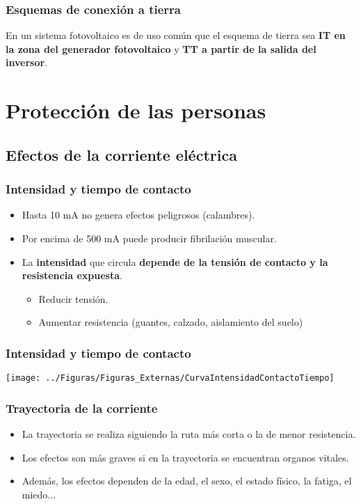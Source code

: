 \documentclass[serif, xcolor=dvipsnames]{beamer}
\begin{document}
\begin{frame}
\frametitle{Esquemas de conexión a tierra}
\begin{block}
{}

En un sistema fotovoltaico es de uso común que el esquema de tierra
sea \textbf{IT en la zona del generador fotovoltaico} y \textbf{TT
a partir de la salida del inversor}. 

\end{block}

\end{frame}

\section{Protección de las personas}


\subsection{Efectos de la corriente eléctrica}


\begin{frame}
\frametitle{Intensidad y tiempo de contacto}
\begin{itemize}
\item Hasta 10 mA no genera efectos peligrosos (calambres).
\item Por encima de 500 mA puede producir fibrilación muscular.
\item La \textbf{intensidad} que circula \textbf{depende de la tensión de
contacto y la resistencia expuesta}.

\begin{itemize}
\item Reducir tensión.
\item Aumentar resistencia (guantes, calzado, aislamiento del suelo)
\end{itemize}
\end{itemize}

\end{frame}

\begin{frame}[plain]
\frametitle{Intensidad y tiempo de contacto}

\texttt{[image: ../Figuras/Figuras\_Externas/CurvaIntensidadContactoTiempo]}


\end{frame}

\begin{frame}
\frametitle{Trayectoria de la corriente}
\begin{itemize}
\item La trayectoria se realiza siguiendo la ruta más corta o la de menor
resistencia.
\item Los efectos son más graves si en la trayectoria se encuentran organos
vitales.
\item Además, los efectos dependen de la edad, el sexo, el estado físico,
la fatiga, el miedo...
\end{itemize}

\end{frame}
\end{document}
